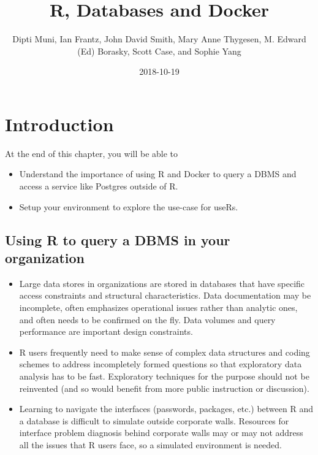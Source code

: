 \documentclass[]{book}
\title{R, Databases and Docker}
\author{Dipti Muni, Ian Frantz, John David Smith, Mary Anne Thygesen, M. Edward
(Ed) Borasky, Scott Case, and Sophie Yang}
\date{2018-10-19}
\providecommand{\tightlist}{%
  \setlength{\itemsep}{0pt}\setlength{\parskip}{0pt}}
\theoremstyle{definition}
\theoremstyle{definition}
\theoremstyle{definition}
\theoremstyle{remark}
\begin{document}
\maketitle

{
\setcounter{tocdepth}{1}
\tableofcontents
}
\hypertarget{introduction}{%
\chapter{Introduction}\label{introduction}}

At the end of this chapter, you will be able to

\begin{itemize}
\tightlist
\item
  Understand the importance of using R and Docker to query a DBMS and
  access a service like Postgres outside of R.
\item
  Setup your environment to explore the use-case for useRs.
\end{itemize}

\hypertarget{using-r-to-query-a-dbms-in-your-organization}{%
\section{Using R to query a DBMS in your
organization}\label{using-r-to-query-a-dbms-in-your-organization}}

\begin{itemize}
\tightlist
\item
  Large data stores in organizations are stored in databases that have
  specific access constraints and structural characteristics. Data
  documentation may be incomplete, often emphasizes operational issues
  rather than analytic ones, and often needs to be confirmed on the fly.
  Data volumes and query performance are important design constraints.
\item
  R users frequently need to make sense of complex data structures and
  coding schemes to address incompletely formed questions so that
  exploratory data analysis has to be fast. Exploratory techniques for
  the purpose should not be reinvented (and so would benefit from more
  public instruction or discussion).
\item
  Learning to navigate the interfaces (passwords, packages, etc.)
  between R and a database is difficult to simulate outside corporate
  walls. Resources for interface problem diagnosis behind corporate
  walls may or may not address all the issues that R users face, so a
  simulated environment is needed.
\end{itemize}
\end{document}
